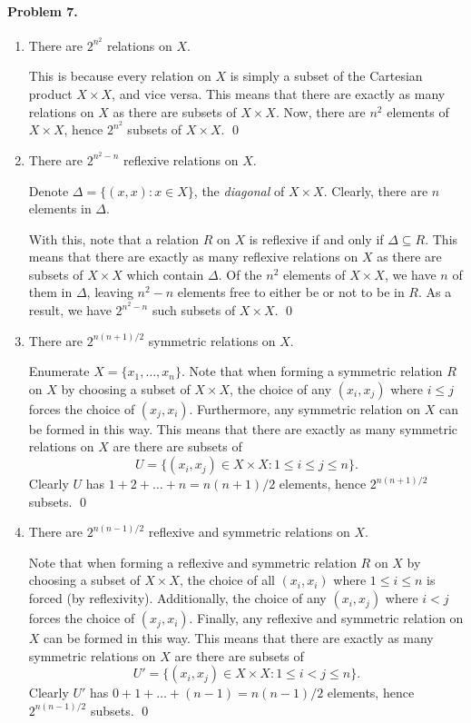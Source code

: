 \documentclass[10pt]{article}
\begin{document}
    \paragraph{Problem 7.}
    \begin{enumerate}
        \item There are $2^{n^2}$ relations on $X$.

        This is because every relation on $X$ is simply a subset of the
        Cartesian product $X \times X$, and vice versa. This means that there
        are exactly as many relations on $X$ as there are subsets of $X \times
        X$. Now, there are $n^2$ elements of $X\times X$, hence $2^{n^2}$
        subsets of $X\times X$. \qed


        \item There are $2^{n^2 - n}$ reflexive relations on $X$.

        Denote $\Delta = \{(x, x) \colon x \in X\}$, the \emph{diagonal} of
        $X\times X$. Clearly, there are $n$ elements in $\Delta$.

        With this, note that a relation $R$ on $X$ is reflexive if and only if
        $\Delta \subseteq R$. This means that there are exactly as many
        reflexive relations on $X$ as there are subsets of $X\times X$ which
        contain $\Delta$. Of the $n^2$ elements of $X\times X$, we have $n$ of
        them in $\Delta$, leaving $n^2 - n$ elements free to either be or not
        to be in $R$. As a result, we have $2^{n^2 - n}$ such subsets of
        $X\times X$. \qed


        \item There are $2^{n(n + 1) / 2}$ symmetric relations on $X$.

        Enumerate $X = \{x_1, \dots, x_n\}$. Note that when forming a
        symmetric relation $R$ on $X$ by choosing a subset of $X\times X$,
        the choice of any $(x_i, x_j)$ where $i \leq j$ forces the choice of
        $(x_j, x_i)$. Furthermore, any symmetric relation on $X$ can be formed
        in this way. This means that there are exactly as many symmetric
        relations on $X$ are there are subsets of \[
            U = \{(x_i, x_j) \in X\times X\colon 1 \leq i \leq j \leq n\}.
        \] Clearly $U$ has $1 + 2 + \dots + n = n(n + 1) / 2$ elements, hence
        $2^{n(n + 1) / 2}$ subsets. \qed


        \item There are $2^{n(n - 1) / 2}$ reflexive and symmetric relations
        on $X$.

        Note that when forming a reflexive and
        symmetric relation $R$ on $X$ by choosing a subset of $X\times X$, the
        choice of all $(x_i, x_i)$ where $1 \leq i \leq n$ is forced (by
        reflexivity). Additionally, the choice of any $(x_i, x_j)$ where $i <
        j$ forces the choice of $(x_j, x_i)$. Finally, any reflexive and
        symmetric relation on $X$ can be formed in this way. This means that
        there are exactly as many symmetric relations on $X$ are there are
        subsets of \[
            U' = \{(x_i, x_j) \in X\times X\colon 1 \leq i < j \leq n\}.
        \] Clearly $U'$ has $0 + 1 + \dots + (n - 1) = n(n - 1) / 2$ elements,
        hence $2^{n(n - 1) / 2}$ subsets. \qed
    \end{enumerate}
\end{document}

